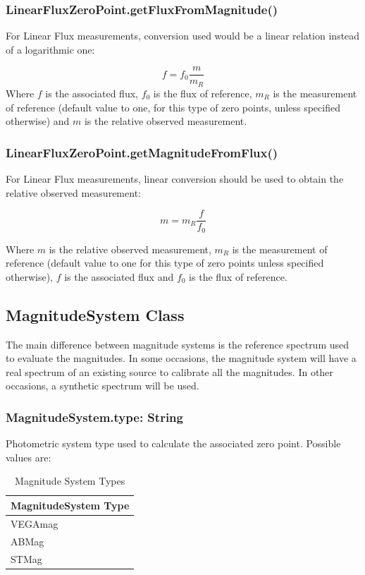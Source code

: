 \documentclass[11pt,a4paper]{ivoa}
\begin{document}
\subsubsection{LinearFluxZeroPoint.getFluxFromMagnitude()}
For Linear Flux measurements, conversion used would be a linear relation instead of a logarithmic one:\par
\[
f = f_0\frac{m}{m_R}
\]
Where $f$ is the associated flux, $f_0$ is the flux of reference, $m_R$ is the measurement of reference (default value to one, for this type of zero points, unless specified otherwise) and $m$ is the relative observed measurement.
\par

\subsubsection{LinearFluxZeroPoint.getMagnitudeFromFlux()}
For Linear Flux measurements, linear conversion should be used to obtain the relative observed measurement:\par
\[
m = m_R \frac{f}{f_0}
\]

Where $m$ is the relative observed measurement, $m_R$ is the measurement of reference (default value to one for this type of zero points unless specified otherwise), $f$ is the associated flux and $f_0$ is the flux of reference.\par

\subsection{MagnitudeSystem Class}
The main difference between magnitude systems is the reference spectrum used to evaluate the magnitudes. In some occasions, the magnitude system will have a real spectrum of an existing source to calibrate all the magnitudes. In other occasions, a synthetic spectrum will be used.
\par

\subsubsection{MagnitudeSystem.type: String}
Photometric system type used to calculate the associated zero point. Possible values are:
\par





\begin{table}[H]
 			\centering
\begin{tabular}{p{2.42in}}
\hline
MagnitudeSystem Type \\
\hline
VEGAmag \\
\hline
ABMag \\
\hline
STMag \\
\hline
\end{tabular}
\caption{Magnitude System Types}
 \end{table}
\end{document}
